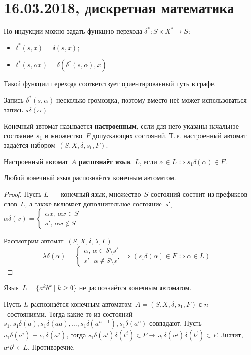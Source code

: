 \chapter{16.03.2018, дискретная математика}
По индукции можно задать функцию перехода $\delta^* \colon S \times X^* \to S$:
\begin{itemize}
	\item $\delta^*(s, x) = \delta(s, x)$;
	\item $\delta^*(s, \alpha x) = \delta(\delta^*(s, \alpha), x)$.
\end{itemize}

Такой функции перехода соответствует ориентированный путь в графе.

Запись $\delta^*(s, \alpha)$ несколько громоздка, поэтому вместо неё может использоваться запись $s \delta(\alpha)$.

Конечный автомат называется \textbf{настроенным}, если для него указаны начальное состояние~$s_1$ и множество~$F$ допускающих состояний.
Т.\,е. настроенный автомат задаётся набором~$(S, X, \delta, s_1, F)$.

Настроенный автомат~$A$ \textbf{распознаёт язык~$L$}, если $\alpha \in L \Leftrightarrow s_1 \delta(\alpha) \in F$.

\begin{statement}
Любой конечный язык распознаётся конечным автоматом.
\end{statement}
\begin{proof}
Пусть $L$~--- конечный язык, множество~$S$ состояний состоит из префиксов слов~$L$, а также включает дополнительное состояние~$s'$, $\alpha \delta(x) =
\begin{cases}
\alpha x, \ \alpha x \in S \\
s', \ \alpha x \notin S
\end{cases}$

Рассмотрим автомат~$(S, X, \delta, \lambda, L)$.
\begin{equation*}
\lambda \delta(\alpha) =
\begin{cases}
\alpha, \ \alpha \in S \setminus s' \\
s', \ \alpha \notin S \setminus s'
\end{cases} \Rightarrow
(s_1 \delta(\alpha) \in F \Leftrightarrow \alpha \in L)
\end{equation*}
\end{proof}

\begin{theorem}
Язык~$L = \{ a^k b^k \mid k \geqslant 0 \}$ не распознаётся конечным автоматом.
\end{theorem}
\begin{proofcontra}
Пусть $L$ распознаётся конечным автоматом~$A = (S, X, \delta, s_1, F)$ с $n$~состояниями.
Тогда какие-то из состояний $s_1, s_1 \delta(a), s_1 \delta(aa), \ldots, s_1 \delta(a^{n-1}), s_1 \delta(a^n)$ совпадают.
Пусть $s_1 \delta(a^i) = s_1 \delta(a^j)$, тогда $s_1 \delta(a^i) \delta(b^i) \in F \Rightarrow
s_1 \delta(a^j) \delta(b^i) \in F$.
Значит, $a^j b^i \in L$.
Противоречие.
\end{proofcontra}

